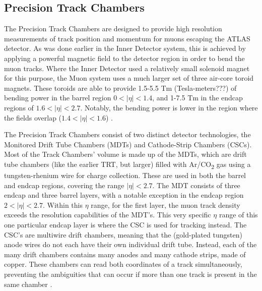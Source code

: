     \subsection{Precision Track Chambers}
        The Precision Track Chambers are designed to provide high resolution measurements of track position and momentum for muons escaping the ATLAS detector. 
        As was done earlier in the Inner Detector system, this is achieved by applying a powerful magnetic field to the detector region in order to bend the muon tracks.
        Where the Inner Detector used a relatively small solenoid magnet for this purpose, the Muon system uses a much larger set of three air-core toroid magnets.
        These toroids are able to provide 1.5-5.5 Tm (Tesla-meters???) of bending power in the barrel region $0<|\eta|<1.4$, and 1-7.5 Tm in the endcap regions of $1.6<|\eta|<2.7$.
        Notably, the bending power is lower in the region where the fields overlap ($1.4<|\eta|<1.6$) \cite{atlas_tdr}.

        The Precision Track Chambers consist of two distinct detector technologies, the Monitored Drift Tube Chambers (MDTs) and Cathode-Strip Chambers (CSCs).
        Most of the Track Chambers' volume is made up of the MDTs, which are drift tube chambers (like the earlier TRT, but larger) filled with Ar/CO\textsubscript{2} gas using a tungsten-rhenium wire for charge collection.
        These are used in both the barrel and endcap regions, covering the range $|\eta| < 2.7$.
        The MDT consists of three endcap and three barrel layers, with a notable exception in the endcap region $2 < |\eta| < 2.7$.
        Within this $\eta$ range, for the first layer, the muon track density exceeds the resolution capabilities of the MDT's.
        This very specific $\eta$ range of this one particular endcap layer is where the CSC is used for tracking instead.
        The CSC's are multiwire drift chambers, meaning that the (gold-plated tungsten) anode wires do not each have their own individual drift tube.
        Instead, each of the many drift chambers contains many anodes and many cathode strips, made of copper.
        These chambers can read both coordinates of a track simultaneously, preventing the ambiguities that can occur if more than one track is present in the same chamber \cite{atlas_tdr}.

